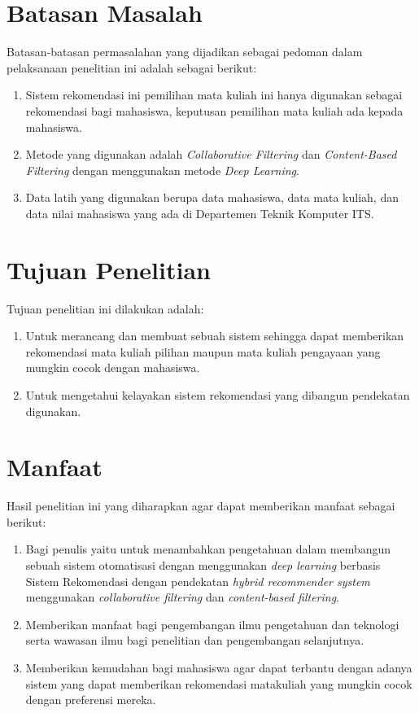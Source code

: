 \section{Batasan Masalah}
Batasan-batasan permasalahan yang dijadikan sebagai pedoman dalam pelaksanaan penelitian ini adalah sebagai berikut:
\begin{enumerate}[noitemsep]
      \item Sistem rekomendasi ini pemilihan mata kuliah ini hanya digunakan sebagai rekomendasi bagi mahasiswa, keputusan pemilihan mata kuliah ada kepada mahasiswa.
      \item Metode yang digunakan adalah \emph{Collaborative Filtering} dan \emph{Content-Based Filtering} dengan menggunakan metode \emph{Deep Learning}.
      \item Data latih yang digunakan berupa data mahasiswa, data mata kuliah, dan data nilai mahasiswa yang ada di Departemen Teknik Komputer ITS.
\end{enumerate}

\section{Tujuan Penelitian}
Tujuan penelitian ini dilakukan adalah:
\begin{enumerate}[noitemsep]
      \item Untuk merancang dan membuat sebuah sistem sehingga dapat memberikan rekomendasi mata kuliah pilihan
            maupun mata kuliah pengayaan yang mungkin cocok dengan mahasiswa.
      \item Untuk mengetahui kelayakan sistem rekomendasi yang dibangun pendekatan digunakan.
\end{enumerate}

\section{Manfaat}
Hasil penelitian ini yang diharapkan agar dapat memberikan manfaat sebagai berikut:
\begin{enumerate}[noitemsep]
      \item Bagi penulis yaitu untuk menambahkan pengetahuan dalam membangun sebuah sistem
            otomatisasi dengan menggunakan \emph{deep learning} berbasis Sistem Rekomendasi
            dengan pendekatan \emph{hybrid recommender system} menggunakan \emph{collaborative filtering} dan \emph{content-based filtering}.
      \item Memberikan manfaat bagi pengembangan ilmu pengetahuan dan teknologi serta wawasan ilmu bagi
            penelitian dan pengembangan selanjutnya.
      \item Memberikan kemudahan bagi mahasiswa agar dapat terbantu dengan adanya sistem yang dapat memberikan rekomendasi matakuliah yang mungkin cocok dengan preferensi mereka.
\end{enumerate}